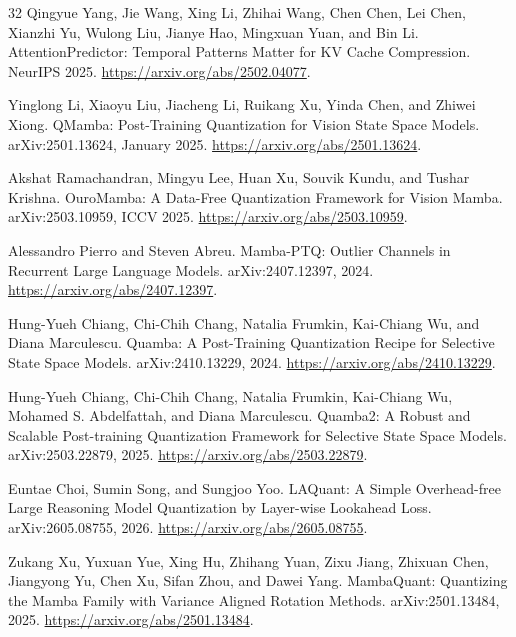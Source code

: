 \documentclass{article}
\begin{document}
\begin{thebibliography}{32}
Qingyue Yang, Jie Wang, Xing Li, Zhihai Wang, Chen Chen, Lei Chen, Xianzhi
Yu, Wulong Liu, Jianye Hao, Mingxuan Yuan, and Bin Li.
\newblock AttentionPredictor: Temporal Patterns Matter for KV Cache
Compression.
\newblock NeurIPS 2025.
\newblock \url{https://arxiv.org/abs/2502.04077}.

Yinglong Li, Xiaoyu Liu, Jiacheng Li, Ruikang Xu, Yinda Chen, and Zhiwei
Xiong.
\newblock QMamba: Post-Training Quantization for Vision State Space Models.
\newblock arXiv:2501.13624, January 2025.
\newblock \url{https://arxiv.org/abs/2501.13624}.

Akshat Ramachandran, Mingyu Lee, Huan Xu, Souvik Kundu, and Tushar Krishna.
\newblock OuroMamba: A Data-Free Quantization Framework for Vision Mamba.
\newblock arXiv:2503.10959, ICCV 2025.
\newblock \url{https://arxiv.org/abs/2503.10959}.

Alessandro Pierro and Steven Abreu.
\newblock Mamba-PTQ: Outlier Channels in Recurrent Large Language Models.
\newblock arXiv:2407.12397, 2024.
\newblock \url{https://arxiv.org/abs/2407.12397}.

Hung-Yueh Chiang, Chi-Chih Chang, Natalia Frumkin, Kai-Chiang Wu, and Diana
Marculescu.
\newblock Quamba: A Post-Training Quantization Recipe for Selective State
Space Models.
\newblock arXiv:2410.13229, 2024.
\newblock \url{https://arxiv.org/abs/2410.13229}.

Hung-Yueh Chiang, Chi-Chih Chang, Natalia Frumkin, Kai-Chiang Wu, Mohamed S.
Abdelfattah, and Diana Marculescu.
\newblock Quamba2: A Robust and Scalable Post-training Quantization Framework
for Selective State Space Models.
\newblock arXiv:2503.22879, 2025.
\newblock \url{https://arxiv.org/abs/2503.22879}.

Euntae Choi, Sumin Song, and Sungjoo Yoo.
\newblock LAQuant: A Simple Overhead-free Large Reasoning Model Quantization
by Layer-wise Lookahead Loss.
\newblock arXiv:2605.08755, 2026.
\newblock \url{https://arxiv.org/abs/2605.08755}.

Zukang Xu, Yuxuan Yue, Xing Hu, Zhihang Yuan, Zixu Jiang, Zhixuan Chen,
Jiangyong Yu, Chen Xu, Sifan Zhou, and Dawei Yang.
\newblock MambaQuant: Quantizing the Mamba Family with Variance Aligned
Rotation Methods.
\newblock arXiv:2501.13484, 2025.
\newblock \url{https://arxiv.org/abs/2501.13484}.


\end{thebibliography}
\end{document}
